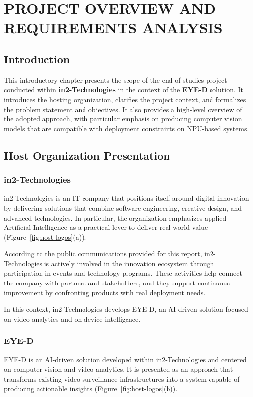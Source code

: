 ﻿\chapter{PROJECT OVERVIEW AND REQUIREMENTS ANALYSIS}
\setcounter{section}{0}
\renewcommand{\thesection}{\arabic{section}}

\section*{Introduction}
This introductory chapter presents the scope of the end-of-studies project conducted within \textbf{in2-Technologies} in the context of the \textbf{EYE-D} solution. It introduces the hosting organization, clarifies the project context, and formalizes the problem statement and objectives. It also provides a high-level overview of the adopted approach, with particular emphasis on producing computer vision models that are compatible with deployment constraints on NPU-based systems.

\section{Host Organization Presentation}
\subsection{in2-Technologies}
in2-Technologies is an IT company that positions itself around digital innovation by delivering solutions that combine software engineering, creative design, and advanced technologies. In particular, the organization emphasizes applied Artificial Intelligence as a practical lever to deliver real-world value (Figure~\ref{fig:host-logos}(a)).

According to the public communications provided for this report, in2-Technologies is actively involved in the innovation ecosystem through participation in events and technology programs. These activities help connect the company with partners and stakeholders, and they support continuous improvement by confronting products with real deployment needs.

In this context, in2-Technologies develops EYE-D, an AI-driven solution focused on video analytics and on-device intelligence.

\subsection{EYE-D}
EYE-D is an AI-driven solution developed within in2-Technologies and centered on computer vision and video analytics. It is presented as an approach that transforms existing video surveillance infrastructures into a system capable of producing actionable insights (Figure~\ref{fig:host-logos}(b)).

